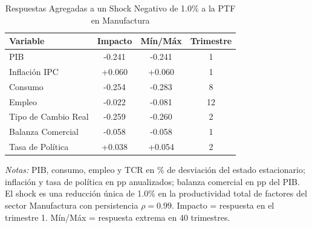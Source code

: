\begin{table}[htbp]
\centering
\caption{Respuestas Agregadas a un Shock Negativo de 1.0\% a la PTF en Manufactura}
\label{tab:mfg_agg}
\begin{threeparttable}
\begin{tabular}{@{}l c c c@{}}
\toprule
Variable & Impacto & Mín/Máx & Trimestre \\
\midrule
PIB & -0.241 & -0.241 & 1 \\
Inflación IPC & +0.060 & +0.060 & 1 \\
Consumo & -0.254 & -0.283 & 8 \\
Empleo & -0.022 & -0.081 & 12 \\
Tipo de Cambio Real & -0.259 & -0.260 & 2 \\
Balanza Comercial & -0.058 & -0.058 & 1 \\
Tasa de Política & +0.038 & +0.054 & 2 \\
\bottomrule
\end{tabular}
\begin{tablenotes}[flushleft]
\footnotesize
\item \textit{Notas:} PIB, consumo, empleo y TCR en \% de desviación del estado estacionario; inflación y tasa de política en pp anualizados; balanza comercial en pp del PIB. El shock es una reducción única de 1.0\% en la productividad total de factores del sector Manufactura con persistencia $\rho = 0.99$. Impacto = respuesta en el trimestre 1. Mín/Máx = respuesta extrema en 40 trimestres.
\end{tablenotes}
\end{threeparttable}
\end{table}
